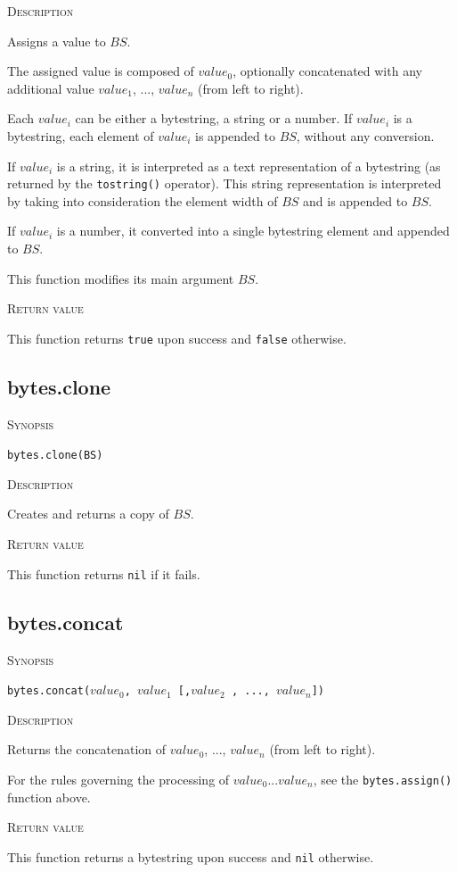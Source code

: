 \documentclass[11pt]{report}
\newcommand{\mansection}[1]{\vspace{0.5em}\par\noindent\textsc{#1}\vspace{0.5em}\par}
\begin{document}
\mansection{Description}

  Assigns a value to $BS$. 

  The assigned value is composed of $value_0$, optionally concatenated with 
  any additional value $value_1$, ..., $value_n$ (from left to right).

  Each $value_i$ can be either a bytestring, a string or a number.
  If $value_i$ is a bytestring, each element of $value_i$ is appended to $BS$, 
  without any conversion.

  If $value_i$ is a string, it is interpreted as a text representation of
  a bytestring (as returned by the \texttt{tostring()} operator). This string
  representation is interpreted by taking into consideration the element width 
  of $BS$ and is appended to $BS$.

  If $value_i$ is a number, it converted into a single bytestring element and 
  appended to $BS$.

  This function modifies its main argument $BS$.

\mansection{Return value}

  This function returns \texttt{true} upon success and \texttt{false} otherwise.

\subsection{bytes.clone}

\mansection{Synopsis}
\texttt{bytes.clone(BS)}

\mansection{Description}
  Creates and returns a copy of $BS$.

\mansection{Return value}
  This function returns \texttt{nil} if it fails.

\subsection{bytes.concat}

\mansection{Synopsis}
\texttt{bytes.concat($value_0$, $value_1$ [,$value_2$ , ..., $value_n$])}

\mansection{Description}
  Returns the concatenation of $value_0$, ..., $value_n$ (from left to right).

  For the rules governing the processing of $value_0 ... value_n$, see
  the \texttt{bytes.assign()} function above.

\mansection{Return value}
  This function returns a bytestring upon success and \texttt{nil} otherwise.
\end{document}
